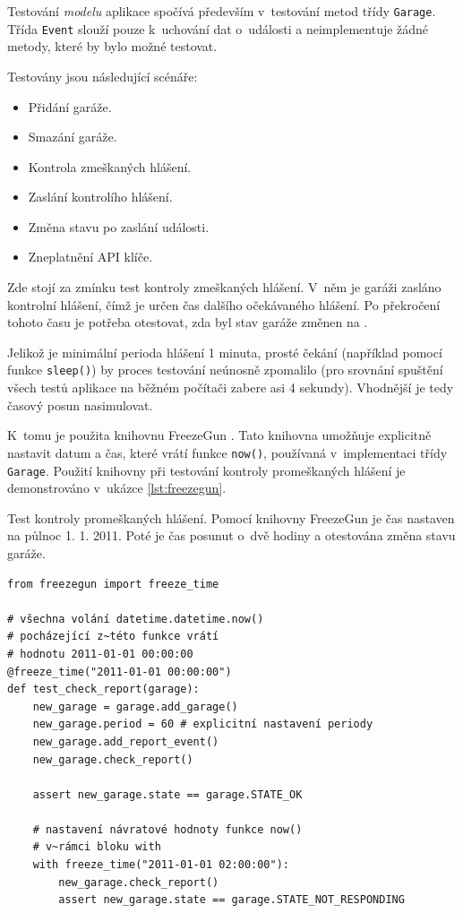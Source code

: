 Testování \textit{modelu} aplikace spočívá především v~testování metod třídy \texttt{Garage}. Třída \texttt{Event} slouží pouze k~uchování dat o~události a neimplementuje žádné metody, které by bylo možné testovat.

Testovány jsou následující scénáře:

\begin{itemize}
    \item Přidání garáže.
    \item Smazání garáže.
    \item Kontrola zmeškaných hlášení.
    \item Zaslání kontrolího hlášení.
    \item Změna stavu po zaslání události.
    \item Zneplatnění API klíče.
\end{itemize}

Zde stojí za zmínku test kontroly zmeškaných hlášení. V~něm je garáži zasláno kontrolní hlášení, čímž je určen čas dalšího očekávaného hlášení. Po překročení tohoto času je potřeba otestovat, zda byl stav garáže změnen na .

Jelikož je minimální perioda hlášení 1 minuta, prosté čekání (například pomocí funkce \texttt{sleep()}) by proces testování neúnosně zpomalilo (pro srovnání spuštění všech testů aplikace na běžném počítači zabere asi 4 sekundy). Vhodnější je tedy časový posun nasimulovat.

K~tomu je použita knihovnu FreezeGun \cite{freezegun}. Tato knihovna umožňuje explicitně nastavit datum a čas, které vrátí funkce \texttt{now()}, používaná v~implementaci třídy \texttt{Garage}. Použití knihovny při testování kontroly promeškaných hlášení je demonstrováno v~ukázce \ref{lst:freezegun}.

\begin{listing}[htbp]
\caption{\label{lst:freezegun} Test kontroly promeškaných hlášení. Pomocí knihovny FreezeGun je čas nastaven na půlnoc 1. 1. 2011. Poté je čas posunut o~dvě hodiny a otestována změna stavu garáže.}
\begin{verbatim}
from freezegun import freeze_time

# všechna volání datetime.datetime.now()
# pocházející z~této funkce vrátí
# hodnotu 2011-01-01 00:00:00
@freeze_time("2011-01-01 00:00:00")
def test_check_report(garage):
    new_garage = garage.add_garage()
    new_garage.period = 60 # explicitní nastavení periody
    new_garage.add_report_event()
    new_garage.check_report()

    assert new_garage.state == garage.STATE_OK

    # nastavení návratové hodnoty funkce now()
    # v~rámci bloku with
    with freeze_time("2011-01-01 02:00:00"):
        new_garage.check_report()
        assert new_garage.state == garage.STATE_NOT_RESPONDING
\end{verbatim}
\end{listing}

